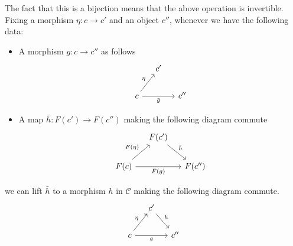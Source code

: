 \documentclass[main.tex]{subfiles}
\begin{document}
The fact that this is a bijection means that the above operation is invertible. Fixing a morphism $\eta\colon c \to c'$ and an object $c''$, whenever we have the following data:
\begin{itemize}
  \item A morphism $g\colon c \to c''$ as follows
    \begin{equation*}
      \begin{tikzcd}[column sep=small]
        & c'
        \\
        c
        \arrow[ur, "\eta"]
        \arrow[rr, swap, "\bar{g}"]
        && c''
      \end{tikzcd}
    \end{equation*}
  \item A map $\bar{h}\colon F(c') \to F(c'')$ making the following diagram commute
    \begin{equation*}
      \begin{tikzcd}[column sep=small]
        & F(c')
        \arrow[dr, "\bar{h}"]
        \\
        F(c)
        \arrow[ur, "F(\eta)"]
        \arrow[rr, swap, "F(g)"]
        && F(c'')
      \end{tikzcd}
    \end{equation*}
\end{itemize}
we can lift $\bar{h}$ to a morphism $h$ in $\mathcal{C}$ making the following diagram commute.
\begin{equation*}
  \begin{tikzcd}[column sep=small]
    & c'
    \arrow[dr, "h"]
    \\
    c
    \arrow[ur, "\eta"]
    \arrow[rr, swap, "g"]
    && c''
  \end{tikzcd}
\end{equation*}
\end{document}
